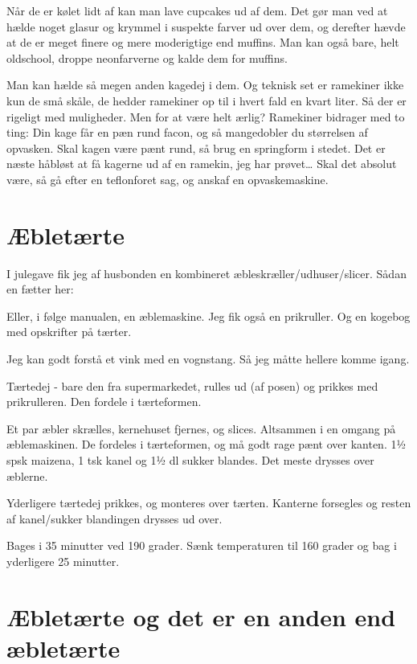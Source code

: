 \documentclass[
  letterpaper,
  DIV=11,
  numbers=noendperiod]{scrreprt}
\begin{document}
Når de er kølet lidt af kan man lave cupcakes ud af dem. Det gør man ved
at hælde noget glasur og krymmel i suspekte farver ud over dem, og
derefter hævde at de er meget finere og mere moderigtige end muffins.
Man kan også bare, helt oldschool, droppe neonfarverne og kalde dem for
muffins.~

Man kan hælde så megen anden kagedej i dem. Og teknisk set er ramekiner
ikke kun de små skåle, de hedder ramekiner op til i hvert fald en kvart
liter. Så der er rigeligt med muligheder. Men for at være helt ærlig?
Ramekiner bidrager med to ting: Din kage får en pæn rund facon, og så
mangedobler du størrelsen af opvasken. Skal kagen være pænt rund, så
brug en springform i stedet. Det er næste håbløst at få kagerne ud af en
ramekin, jeg har prøvet\ldots{} Skal det absolut være, så gå efter en
teflonforet sag, og anskaf en opvaskemaskine.

\hypertarget{uxe6bletuxe6rte}{%
\section{Æbletærte}\label{uxe6bletuxe6rte}}

I julegave fik jeg af husbonden en kombineret
æbleskræller/udhuser/slicer. Sådan en fætter her:

Eller, i følge manualen, en æblemaskine. Jeg fik også en prikruller. Og
en kogebog med opskrifter på tærter.

Jeg kan godt forstå et vink med en vognstang. Så jeg måtte hellere komme
igang.

Tærtedej - bare den fra supermarkedet, rulles ud (af posen) og prikkes
med prikrulleren. Den fordele i tærteformen.

Et par æbler skrælles, kernehuset fjernes, og slices. Altsammen i en
omgang på æblemaskinen. De fordeles i tærteformen, og må godt rage pænt
over kanten. 1½ spsk maizena, 1 tsk kanel og 1½ dl sukker blandes. Det
meste drysses over æblerne.

Yderligere tærtedej prikkes, og monteres over tærten. Kanterne forsegles
og resten af kanel/sukker blandingen drysses ud over.

Bages i 35 minutter ved 190 grader. Sænk temperaturen til 160 grader og
bag i yderligere 25 minutter.

\hypertarget{uxe6bletuxe6rte-og-det-er-en-anden-end-uxe6bletuxe6rte}{%
\section{Æbletærte og det er en anden end
æbletærte}\label{uxe6bletuxe6rte-og-det-er-en-anden-end-uxe6bletuxe6rte}}
\end{document}
